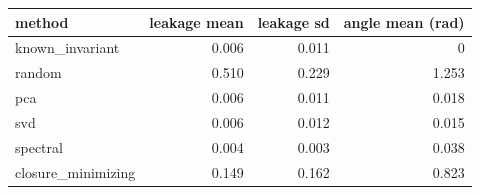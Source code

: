 \begin{tabular}{lrrr}
\toprule
method & leakage mean & leakage sd & angle mean (rad) \\
\midrule
known\_invariant & 0.006 & 0.011 & 0 \\
random & 0.510 & 0.229 & 1.253 \\
pca & 0.006 & 0.011 & 0.018 \\
svd & 0.006 & 0.012 & 0.015 \\
spectral & 0.004 & 0.003 & 0.038 \\
closure\_minimizing & 0.149 & 0.162 & 0.823 \\
\bottomrule
\end{tabular}